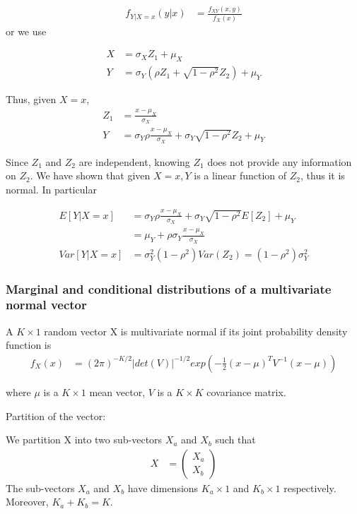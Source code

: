 \documentclass[11pt]{article} %
\begin{document}
\begin{align*}
	f_{Y|X=x} (y|x) &= \frac{f_{XY} (x, y)}{f_X(x)}
\end{align*}
or we use

\begin{align*}
	X &= \sigma_X Z_1 + \mu_X \\
	Y &= \sigma_Y \left(\rho Z_1 + \sqrt{1-\rho^2} Z_2 \right)  + \mu_Y
\end{align*}

Thus, given $X=x$, 
\begin{align*}
	Z_1 &= \frac{x - \mu_X}{\sigma_X} \\
	Y &= \sigma_Y \rho \frac{x- \mu_X}{\sigma_X} + \sigma_Y \sqrt{1- \rho^2} Z_2 + \mu_Y 
\end{align*}

Since $Z_1$ and $Z_2$ are independent, knowing $Z_1$ does not provide any information on $Z_2$. We have shown that given $X=x, Y$ is a linear function of $Z_2$, thus it is normal. In particular

\begin{align*}
	E[Y|X=x] &= \sigma_Y \rho \frac{x- \mu_X}{\sigma_X} + \sigma_Y \sqrt{1- \rho^2} E[Z_2] + \mu_Y  \\
	 &= \mu_Y + \rho \sigma_Y \frac{x-\mu_X}{\sigma_X} \\
	Var[Y|X=x] &= \sigma_Y^2 (1- \rho^2) Var(Z_2) = (1- \rho^2) \sigma_Y^2
\end{align*}

\subsubsection{Marginal and conditional distributions of a multivariate normal vector}

A $K \times 1$ random vector X is multivariate normal if its joint probability density function is 
\begin{align*}
	f_X(x) &= (2\pi)^{-K/2} |det(V)|^{-1/2} exp(-\frac{1}{2} (x-\mu)^T V^{-1}(x-\mu)) 
\end{align*}

where $\mu$ is a $K \times 1$ mean vector, $V$ is a $K \times K$ covariance matrix.

Partition of the vector:

 We partition X into two sub-vectors $X_a$ and $X_b$ such that
\begin{align*}
	X &= \begin{pmatrix}
		X_a \\
		X_b
	\end{pmatrix}
\end{align*}
The sub-vectors $X_a$ and $X_b$ have dimensions $K_a \times 1$ and $K_b \times 1$ respectively. Moreover, $K_a + K_b = K$.
\end{document}
